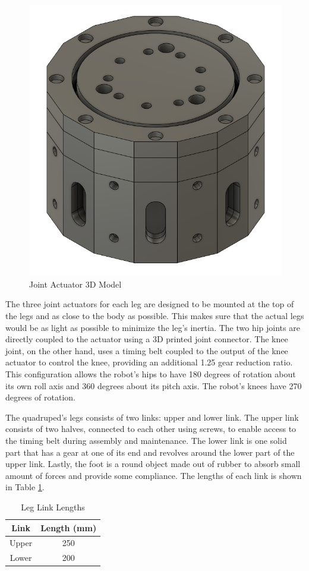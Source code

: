 \documentclass[english]{upeeei}
\providecommand{\tabularnewline}{\\}
\begin{document}
\begin{figure}[H]
\begin{centering}
\includegraphics[width=0.5\columnwidth]{images/joint_actuator}
\par\end{centering}
\caption{Joint Actuator 3D Model\label{fig:joint-actuator}}
\end{figure}

The three joint actuators for each leg are designed to be mounted at the top of the legs and as close to the body as possible. This makes sure that the actual legs would be as light as possible to minimize the leg's inertia. The two hip joints are directly coupled to the actuator using a 3D printed joint connector. The knee joint, on the other hand, uses a timing belt coupled to the output of the knee actuator to control the knee, providing an additional 1.25 gear reduction ratio. This configuration allows the robot's hips to have 180 degrees of rotation about its own roll axis and 360 degrees about its pitch axis. The robot's knees have 270 degrees of rotation. 

The quadruped's legs consists of two links: upper and lower link. The upper link consists of two halves, connected to each other using screws, to enable access to the timing belt during assembly and maintenance. The lower link is one solid part that has a gear at one of its end and revolves around the lower part of the upper link. Lastly, the foot is a round object made out of rubber to absorb small amount of forces and provide some compliance. The lengths of each link is shown in Table \ref{tab:link-lengths}.

\begin{table}[H]
\caption{Leg Link Lengths\label{tab:link-lengths}}

\centering{}
\begin{tabular}{|c|c|}
\hline 
Link & Length (mm)\tabularnewline
\hline 
\hline 
Upper & 250\tabularnewline
\hline 
Lower & 200\tabularnewline
\hline 
\hline 
\end{tabular}
\end{table}
\end{document}
